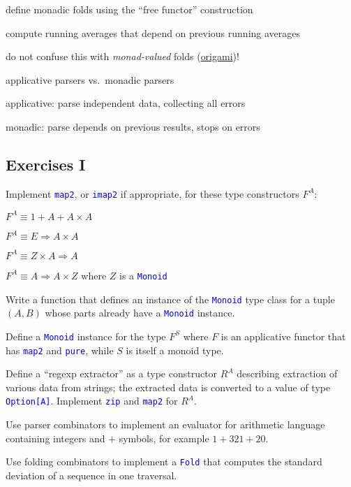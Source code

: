 define monadic folds using the ``free functor'' construction

compute running averages that depend on previous running averages

do not confuse this with \emph{monad-valued} folds (\href{https://github.com/atnos-org/origami}{origami})!

applicative parsers vs.\ monadic parsers

applicative: parse independent data, collecting all errors

monadic: parse depends on previous results, stops on errors


\subsection{Exercises I }

Implement \texttt{\textcolor{blue}{\footnotesize{}map2}}, or \texttt{\textcolor{blue}{\footnotesize{}imap2}}
if appropriate, for these type constructors $F^{A}$:

$F^{A}\equiv1+A+A\times A$

$F^{A}\equiv E\Rightarrow A\times A$

$F^{A}\equiv Z\times A\Rightarrow A$ 

$F^{A}\equiv A\Rightarrow A\times Z$ where $Z$ is a \texttt{\textcolor{blue}{\footnotesize{}Monoid}} 

Write a function that defines an instance of the \texttt{\textcolor{blue}{\footnotesize{}Monoid}}
type class for a tuple $\left(A,B\right)$ whose parts already have
a \texttt{\textcolor{blue}{\footnotesize{}Monoid}} instance.

Define a \texttt{\textcolor{blue}{\footnotesize{}Monoid}} instance
for the type $F^{S}$ where $F$ is an applicative functor that has
\texttt{\textcolor{blue}{\footnotesize{}map2}} and \texttt{\textcolor{blue}{\footnotesize{}pure}},
while $S$ is itself a monoid type.

Define a ``regexp extractor'' as a type constructor $R^{A}$ describing
extraction of various data from strings; the extracted data is converted
to a value of type \texttt{\textcolor{blue}{\footnotesize{}Option{[}A{]}}}.
Implement \texttt{\textcolor{blue}{\footnotesize{}zip}} and \texttt{\textcolor{blue}{\footnotesize{}map2}}
for $R^{A}$.

Use parser combinators to implement an evaluator for arithmetic language
containing integers and $+$ symbols, for example $1+321+20$.

Use folding combinators to implement a \texttt{\textcolor{blue}{\footnotesize{}Fold}}
that computes the standard deviation of a sequence in one traversal.

